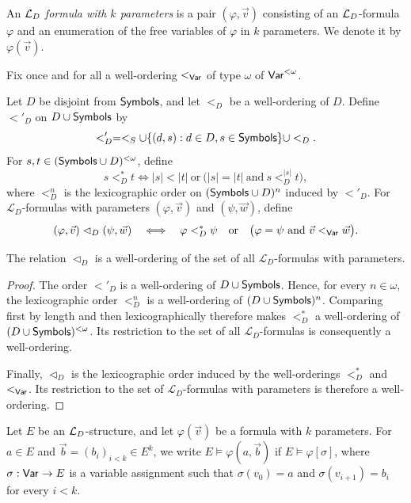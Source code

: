 An $\mathcal L_D$ \emph{formula with $k$ parameters} is a pair $(\varphi,\vec v)$ consisting of an $\mathcal L_D$-formula $\varphi$ and an enumeration of the free variables of $\varphi$ in $k$ parameters. We denote it by $\varphi(\vec v)$.

Fix once and for all a well-ordering $<_{\mathsf{Var}}$ of type $\omega$ of
$\mathsf{Var}^{<\omega}$.

Let $D$ be disjoint from $\mathsf{Symbols}$, and let $<_D$ be a
well-ordering of $D$. Define $<'_D$ on $D\cup\mathsf{Symbols}$ by
\[
 <'_D=<_S\cup \{(d,s):d\in D, s\in \mathsf{Symbols}\}\cup <_D.
\]
For $s,t\in(\mathsf{Symbols} \cup D)^{<\omega}$, define
\[
 s<^*_D t\iff |s|<|t|\ \text{or}\
 \bigl(|s|=|t|\ \text{and}\ s<^{|s|}_{D}t\bigr),
\]
where $<^{n}_D$ is the lexicographic order on $(\mathsf{Symbols} \cup D)^{n}$ induced by $<'_D$.
For $\mathcal L_D$-formulas with parameters
$(\varphi,\vec v)$ and $(\psi,\vec w)$, define
\[
 (\varphi,\vec v)\mathrel{\lhd_D}(\psi,\vec w)
 \quad\Longleftrightarrow\quad
 \varphi<^*_D\psi
 \quad\text{or}\quad
 \bigl(\varphi=\psi\ \text{and}\ \vec v<_{\mathsf{Var}}\vec w\bigr).
\]

\begin{lemma}
The relation $\lhd_D$ is a well-ordering of the set of all
$\mathcal L_D$-formulas with parameters.
\end{lemma}
\begin{proof}
The order $<'_D$ is a well-ordering of $D\cup\mathsf{Symbols}$. Hence,
for every $n\in\omega$, the lexicographic order $<^n_D$ is a
well-ordering of $(D\cup\mathsf{Symbols})^n$. Comparing first by length and
then lexicographically therefore makes $<^*_D$ a well-ordering
of $(D\cup\mathsf{Symbols})^{<\omega}$. Its restriction to the set of all
$\mathcal L_D$-formulas is consequently a well-ordering.

Finally, $\lhd_D$ is the lexicographic order induced by the
well-orderings $<^*_D$ and $<_{\mathsf{Var}}$. Its restriction to the set of
$\mathcal L_D$-formulas with parameters is therefore a
well-ordering.
\end{proof}

Let $E$ be an $\mathcal L_D$-structure, and let $\varphi(\vec v)$ be a
formula with $k$ parameters. For $a\in E$ and
$\vec b=(b_i)_{i<k}\in E^k$, we write $E\models\varphi(a,\vec b)$ if $E\models\varphi[\sigma]$, where $\sigma:\mathsf{Var}\to E$ is a variable assignment such that $\sigma(v_0)=a$ and $\sigma(v_{i+1})=b_i$ for every $i<k$.

